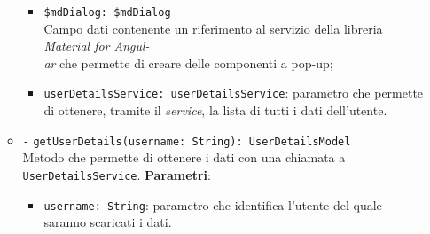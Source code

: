 \begin{itemize}
\begin{itemize}
\begin{itemize}
			\item \texttt{\$mdDialog: \$mdDialog} \\
			Campo dati contenente un riferimento al servizio della libreria \textit{Material for Angul-\\ar{}} che permette di creare delle componenti a pop-up;
			\item \texttt{userDetailsService: userDetailsService}: parametro che permette di ottenere, tramite il \textit{service}, la lista di tutti i dati dell'utente.
		\end{itemize}
		\item \texttt{-} \texttt{getUserDetails(username: String): UserDetailsModel} \\ Metodo che permette di ottenere i dati con una chiamata a \texttt{UserDetailsService}.
		\textbf{Parametri}:
		\begin{itemize}
			\item \texttt{username: String}: parametro che identifica l'utente del quale saranno scaricati i dati.
		\end{itemize}
	\end{itemize}
\end{itemize}

